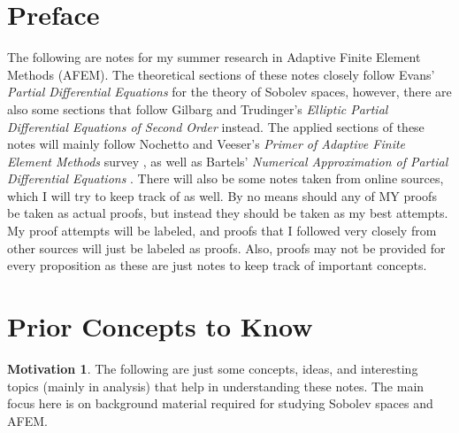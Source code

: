\documentclass[11pt]{article}
\makeatletter
\theoremstyle{definition}
\newtheorem*{motivation}{Motivation}
\newcommand\frontmatter{%
    \cleardoublepage
  \pagenumbering{roman}}
\newcommand\mainmatter{%
    \cleardoublepage
  \pagenumbering{arabic}}
\makeatother
\begin{document}
\frontmatter
{}
\pagestyle{fancy}
\fancyhead[L]{}
\fancyhead[R]{}

\tableofcontents
\newpage

\section*{Preface}
%
The following are notes for my summer research in Adaptive Finite Element Methods (AFEM).
The theoretical sections of these notes closely follow Evans' \textit{Partial Differential Equations} \cite{evans1998partial} for the theory of Sobolev spaces, however,
there are also some sections that follow Gilbarg and Trudinger's \textit{Elliptic Partial Differential Equations of Second Order} \cite{gilbarg2001elliptic} instead.
The applied sections of these notes will mainly follow Nochetto and Veeser's \textit{Primer of Adaptive Finite Element Methods} survey \cite{Nochetto2012},
as well as Bartels'
\textit{Numerical Approximation of Partial Differential Equations} \cite{bartels2016numerical}.
There will also be some notes taken from online sources, which I will try to keep track of as well.
By no means should any of MY proofs be taken as actual proofs, but instead they should be taken as my best attempts.
My proof attempts will be labeled, and proofs that I followed very closely from other sources will just be labeled as proofs.
Also, proofs may not be provided for every proposition as these are just notes to keep track of important concepts.

\fancyhead[L]{\leftmark}
\fancyhead[R]{\rightmark}
\fancyhead[C]{}
\newpage
\mainmatter

\section{Prior Concepts to Know}
\begin{motivation}
The following are just some concepts, ideas, and interesting topics (mainly in analysis) that help in understanding these notes.
The main focus here is on background material required for studying Sobolev spaces and AFEM.
\end{motivation}
\end{document}

